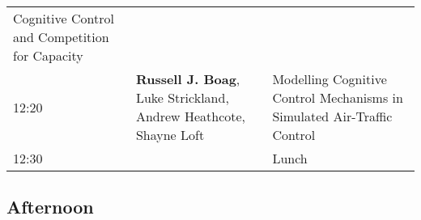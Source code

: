 \documentclass[]{article}
\begin{document}
\begin{longtable}[]{@{}lll@{}}
\begin{minipage}[t]{0.51\columnwidth}
Cognitive Control and Competition for Capacity\strut
\end{minipage}\tabularnewline
\begin{minipage}[t]{0.03\columnwidth}\raggedright\strut
12:20\strut
\end{minipage} & \begin{minipage}[t]{0.38\columnwidth}\raggedright\strut
\textbf{Russell J. Boag}, Luke Strickland, Andrew Heathcote, Shayne
Loft\strut
\end{minipage} & \begin{minipage}[t]{0.51\columnwidth}\raggedright\strut
Modelling Cognitive Control Mechanisms in Simulated Air-Traffic
Control\strut
\end{minipage}\tabularnewline
\begin{minipage}[t]{0.03\columnwidth}\raggedright\strut
12:30\strut
\end{minipage} & \begin{minipage}[t]{0.38\columnwidth}\raggedright\strut
\strut
\end{minipage} & \begin{minipage}[t]{0.51\columnwidth}\raggedright\strut
Lunch\strut
\end{minipage}\tabularnewline
\bottomrule
\end{longtable}

\subsection{Afternoon}\label{afternoon}
\end{document}
